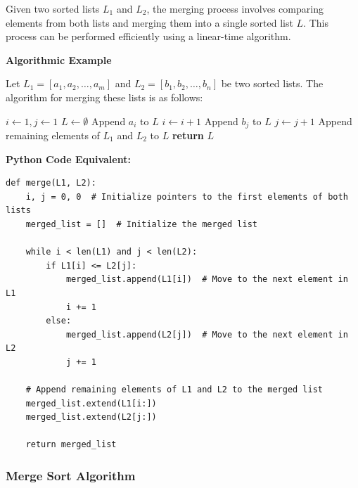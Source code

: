 \documentclass[12pt]{book} %
\begin{document}
Given two sorted lists \( L_1 \) and \( L_2 \), the merging process involves comparing elements from both lists and merging them into a single sorted list \( L \). This process can be performed efficiently using a linear-time algorithm.

\textbf{Algorithmic Example}

Let \( L_1 = [a_1, a_2, \ldots, a_m] \) and \( L_2 = [b_1, b_2, \ldots, b_n] \) be two sorted lists. The algorithm for merging these lists is as follows:

\begin{algorithm}[H]
\caption{Merge Two Sorted Lists}
\begin{algorithmic}[1]
    \State \( i \gets 1, j \gets 1 \) 
    \State \( L \gets \emptyset \) 
            \State Append \( a_i \) to \( L \) 
            \State \( i \gets i + 1 \)
        \Else
            \State Append \( b_j \) to \( L \) 
            \State \( j \gets j + 1 \)
        \EndIf
    \EndWhile
    \State Append remaining elements of \( L_1 \) and \( L_2 \) to \( L \) 
    \State \textbf{return} \( L \)
\EndProcedure
\end{algorithmic}
\end{algorithm}
\FloatBarrier
\textbf{Python Code Equivalent:}
\FloatBarrier
\begin{lstlisting}
def merge(L1, L2):
    i, j = 0, 0  # Initialize pointers to the first elements of both lists
    merged_list = []  # Initialize the merged list

    while i < len(L1) and j < len(L2):
        if L1[i] <= L2[j]:
            merged_list.append(L1[i])  # Move to the next element in L1
            i += 1
        else:
            merged_list.append(L2[j])  # Move to the next element in L2
            j += 1

    # Append remaining elements of L1 and L2 to the merged list
    merged_list.extend(L1[i:])
    merged_list.extend(L2[j:])
    
    return merged_list

\end{lstlisting}

\subsubsection{Merge Sort Algorithm}
\end{document}
